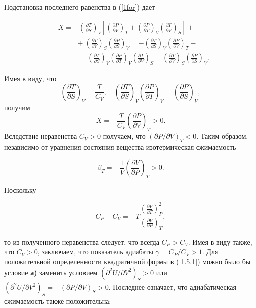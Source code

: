 \documentclass[a4paper,14pt]{article} %
\begin{document}
Подстановка последнего равенства в (\ref{1for}) дает

\begin{equation*}
	\begin{aligned}
		&X=-\left(\frac{\partial T}{\partial S}\right)_{V}\left[\left(\frac{\partial P}{\partial V}\right)_{T}+\left(\frac{\partial P}{\partial T}\right)_{V}\left(\frac{\partial T}{\partial V}\right)_{S}\right]+ \\
		&\ \ \ \ \ \ \ \quad+\left(\frac{\partial T}{\partial V}\right)_{S}\left(\frac{\partial P}{\partial S}\right)_{V}=-\left(\frac{\partial T}{\partial S}\right)_{V}\left(\frac{\partial P}{\partial V}\right)_{T}- \\
		&\ \ \ \ \ \ \ \ \ \ \ \ \ -\left(\frac{\partial T}{\partial S}\right)_{V}\left(\frac{\partial P}{\partial T}\right)_{V}\left(\frac{\partial T}{\partial V}\right)_{S}+\left(\frac{\partial T}{\partial V}\right)_{S}\left(\frac{\partial P}{\partial S}\right)_{V} .
	\end{aligned}
\end{equation*}

Имея в виду, что
$$
\left(\frac{\partial T}{\partial S}\right)_{V}=\frac{T}{C_{V}}, \quad\left(\frac{\partial T}{\partial S}\right)_{V}\left(\frac{\partial P}{\partial T}\right)_{V}=\left(\frac{\partial P}{\partial S}\right)_{V},
$$
получим
$$
X=-\frac{T}{C_{V}}\left(\frac{\partial P}{\partial V}\right)_{T}>0 .
$$
Вследствие неравенства $C_{V}>0$ получаем, что $(\partial P / \partial V)_{T}<0 .$ Таким образом, независимо от уравнения состояния вещества изотермическая сжимаемость

\begin{equation*}
	\beta_{T}=-\frac{1}{V}\left(\frac{\partial V}{\partial P}\right)_{T}>0.
\end{equation*}

Поскольку 

\begin{equation*}
	C_{P}-C_{V}=-T \frac{(\frac{\partial V} {\partial T})_{P}^{2}}{(\frac{\partial V}{ \partial P})_{T}},
\end{equation*}

то из полученного неравенства следует, что всегда $C_{P}>C_{V} .$ Имея в виду также, что $C_{V}>0$, заключаем, что показатель адиабаты $\gamma=C_{P} / C_{V}>1 .$ Для положительной определенности квадратичной формы в (\ref{1.5.1}) можно было бы условие \textbf{а)} заменить условием $\left(\partial^{2} U / \partial V^{2}\right)_{S}>0$ или $\left(\partial^{2} U / \partial V^{2}\right)_{S}=-(\partial P / \partial V)_{S}>0 .$ Последнее означает, что адиабатическая сжимаемость также положительна:
\end{document}
